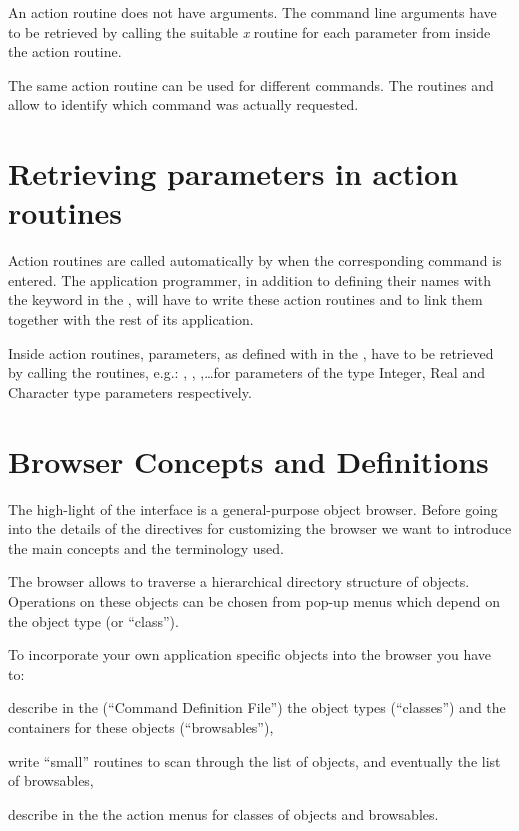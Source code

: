 \begin{figure}[tb]
\end{figure}

An action routine does not have arguments.
The command line arguments have to be retrieved 
by calling the suitable \textsl{x} routine for each parameter
from inside the action routine.

The same action routine can be used for different commands.
The routines  and  allow to identify which
command was actually requested.

\section{Retrieving parameters in action routines}

Action routines are called automatically by \KUIP{} when the corresponding
command is entered. The application programmer, in addition to defining
their names with the  keyword in the \CDF{}, will have to write
these action routines and to link them together with the rest of its application.

Inside action routines, parameters, as defined with 
in the \CDF{}, have to be retrieved by calling the
\KUGETx{} routines, e.g.:
, , 
,\ldots for parameters of the
type Integer, Real and Character type parameters respectively.
%
%
\fi
%
%
\section{Browser Concepts and Definitions}
\label{ref:rebrodef}

The high-light of the \KUIPMotif{} interface is a general-purpose object
browser.
Before going into the details of the \CDF{} directives for customizing
the browser we want to introduce the main concepts and the terminology
used.

The browser allows to traverse a hierarchical directory structure of 
objects. Operations on these objects can be chosen from pop-up menus which
depend on the object type (or ``class'').

To incorporate your own application specific objects into the browser
you have to:
\begin{UL}
\item
describe in the \CDF{} (``Command Definition File'') the object types 
(``classes'') and the containers for these objects (``browsables''),
\item
write ``small'' routines to scan through the list of objects, and 
eventually the list of browsables,
\item
describe in the \CDF{} the action menus for classes of objects and browsables.
\end{UL}

